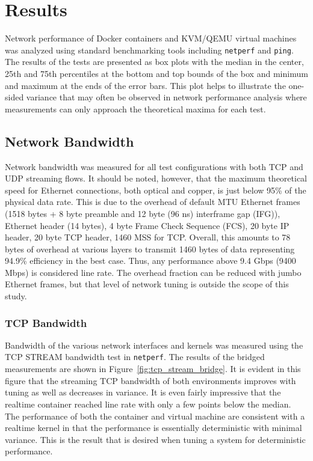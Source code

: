\chapter{Results}
\label{sec:results}
Network performance of Docker containers and KVM/QEMU virtual machines was analyzed using standard benchmarking tools including \texttt{netperf} and \texttt{ping}.  
The results of the tests are presented as box plots with the median in the center, 25th and 75th percentiles at the bottom and top bounds of the box and minimum and maximum at the ends of the error bars.
This plot helps to illustrate the one-sided variance that may often be observed in network performance analysis where measurements can only approach the theoretical maxima for each test.  

\section{Network Bandwidth} %
\label{sec:networkbandwidth}
Network bandwidth was measured for all test configurations with both TCP and UDP streaming flows.
It should be noted, however, that the maximum theoretical speed for Ethernet connections, both optical and copper, is just below 95\% of the physical data rate.
This is due to the overhead of default MTU Ethernet frames (1518 bytes + 8 byte preamble and 12 byte (96 ns) interframe gap (IFG)), Ethernet header (14 bytes), 4 byte Frame Check Sequence (FCS), 20 byte IP header, 20 byte TCP header, 1460 MSS for TCP.
Overall, this amounts to 78 bytes of overhead at various layers to transmit 1460 bytes of data representing 94.9\% efficiency in the best case.  
Thus, any performance above 9.4 Gbps (9400 Mbps) is considered line rate.  
The overhead fraction can be reduced with jumbo Ethernet frames, but that level of network tuning is outside the scope of this study.

\subsection{TCP Bandwidth} %
\label{sub:tcpbandwidth}
Bandwidth of the various network interfaces and kernels was measured using the TCP STREAM bandwidth test in \texttt{netperf}.
The results of the bridged measurements are shown in Figure~\ref{fig:tcp_stream_bridge}. 
It is evident in this figure that the streaming TCP bandwidth of both environments improves with tuning as well as decreases in variance.  
It is even fairly impressive that the realtime container reached line rate with only a few points below the median.  
The performance of both the container and virtual machine are consistent with a realtime kernel in that the performance is essentially deterministic with minimal variance.
This is the result that is desired when tuning a system for deterministic performance.

